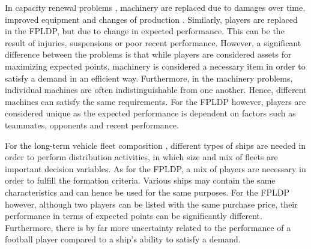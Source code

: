 \newpar

In capacity renewal problems \citep{Chand,Rajagopalan}, machinery are replaced due to damages over time, improved equipment and changes of production \citep{Hopp,Adkins}. Similarly, players are replaced in the FPLDP, but due to change in expected performance. This can be the result of injuries, suspensions or poor recent performance. However, a significant difference between the problems is that while players are considered assets for maximizing expected points, machinery is considered a necessary item in order to satisfy a demand in an efficient way. Furthermore, in the machinery problems, individual machines are often indistinguishable from one another. Hence, different machines can satisfy the same requirements. For the FPLDP however, players are considered unique as the expected performance is dependent on factors such as teammates, opponents and recent performance.

\newpar

For the long-term vehicle fleet composition \citep{Jabali}, different types of ships are needed in order to perform distribution activities, in which size and mix of fleets are important decision variables. As for the FPLDP, a mix of players are necessary in order to fulfill the formation criteria. Various ships may contain the same characteristics and can hence be used for the same purposes. For the FPLDP however, although two players can be listed with the same purchase price, their performance in terms of expected points can be significantly different. Furthermore, there is by far more uncertainty related to the performance of a football player compared to a ship's ability to satisfy a demand. 




\begin{comment}
\cite{Bell} studied team composition variables in order to increase team performance. The results of the meta-analysis performed can be used to effectively compose teams in organizations. \cite{Davis} aim to determine the optimal composition of the pre-hospital medical response team and evaluate the importance of including a doctor to the team. \cite{Jabali} present a continuous approximation model to determine the long-term vehicle fleet composition needed to perform distribution activities, in which fleet size and mix of fleets are important decision variables.  These problems resembles the Fantasy Team problem as similar decisions arise when one are to decide which formation one should use in addition to the mix of players. 
\end{comment}




